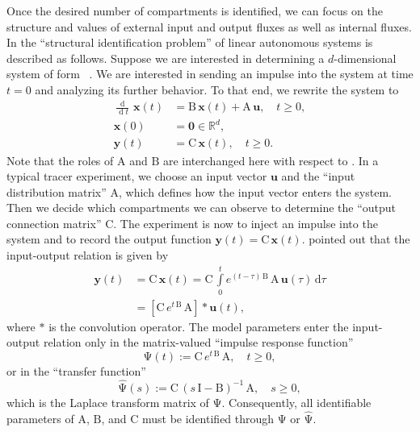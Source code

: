 \documentclass[smallextended]{svjour3}
\makeatletter
\renewcommand*{\eqref}[1]{%
  \hyperref[{#1}]{\textup{\tagform@{\ref*{#1}}}}%
}
\renewcommand{\tens}[1]{\mathrm{#1}}
\renewcommand{\vec}[1]{\mathbf{#1}}
\newcommand{\R}{\mathbb{R}}
\newcommand{\intl}{\int\limits}
\newcommand{\deriv}[1]{\frac{\operatorname{d}}{\operatorname{d}#1}}
\newcommand{\dd}[1]{\,\mathrm{d}#1}
\renewcommand{\emph}[1]{``#1''}
\makeatother
\begin{document}
Once the desired number of compartments is identified, we can focus on the structure and values of external input and output fluxes as well as internal fluxes.
In \citet[Chapter~16]{Anderson1983} the \emph{structural identification problem} of linear autonomous systems is described as follows.
Suppose we are interested in determining a $d$-dimensional system of form~\eqref{eqn:lin_CS_sys}.
We are interested in sending an impulse into the system at time $t=0$ and analyzing its further behavior.
To that end, we rewrite the system to
\begin{equation}\label{eqn:ABC_system}
	\begin{aligned}
		\deriv{t}\,\vec{x}(t) &= \tens{B}\,\vec{x}(t) + \tens{A}\,\vec{u},	\quad t\geq0,\\
		\vec{x}(0) &= \vec{0}\in\R^d,\\
		\vec{y}(t) &= \tens{C}\,\vec{x}(t),\quad t\geq0.
	\end{aligned}
\end{equation}
Note that the roles of $\tens{A}$ and $\tens{B}$ are interchanged here with respect to \citet{Anderson1983}.
In a typical tracer experiment, we choose an input vector $\vec{u}$ and the \emph{input distribution matrix} $\tens{A}$, which defines how the input vector enters the system.
Then we decide which compartments we can observe to determine the \emph{output connection matrix} $\tens{C}$.
The experiment is now to inject an impulse into the system and to record the output function $\vec{y}(t) =\tens{C}\,\vec{x}(t)$.
\citet{Bellman1970MBS} pointed out that the input-output relation is given by
\begin{align*}
	\vec{y}(t) &= \tens{C}\,\vec{x}(t) = \tens{C}\,\intl_0^t e^{(t-\tau)\,\tens{B}}\,\tens{A}\,\vec{u}(\tau)\dd{\tau}\\
	&= \left[\tens{C}\,e^{t\,\tens{B}}\,\tens{A}\right] * \vec{u}(t),
\end{align*}
where $*$ is the convolution operator.
The model parameters enter the input-output relation only in the matrix-valued \emph{impulse response function}
\begin{equation}
	\tens{\Psi}(t):=\tens{C}\,e^{t\,\tens{B}}\,\tens{A},\quad t\geq0,
\end{equation}
or in the \emph{transfer function}
\begin{equation}
	\widehat{\tens{\Psi}}(s) := \tens{C}\,(s\,\tens{I}-\tens{B})^{-1}\,\tens{A}, \quad s\geq0,
\end{equation}
which is the Laplace transform matrix of $\tens{\Psi}$.
Consequently, all identifiable parameters of $\tens{A}$, $\tens{B}$, and $\tens{C}$ must be identified through $\tens{\Psi}$ or $\widehat{\tens{\Psi}}$.
\end{document}
